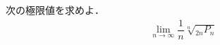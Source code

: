 \documentclass[../../main.tex]{subfiles}
\begin{document}
次の極限値を求めよ．
\begin{align}
  \lim_{n\to\infty}\dfrac{1}{n}\sqrt[n]{_{2n}P_n}
\end{align}
\end{document}
